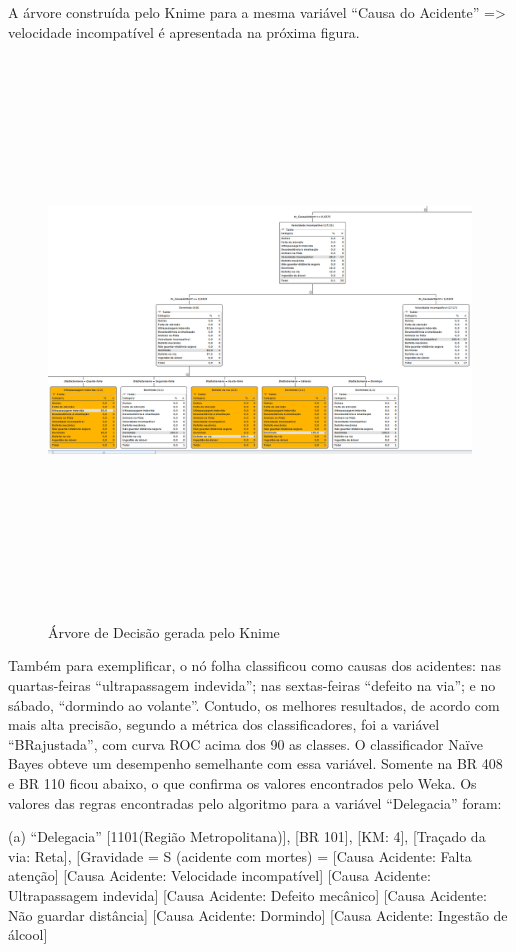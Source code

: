 A árvore construída pelo Knime para a mesma variável “Causa do Acidente” => velocidade incompatível é apresentada na
próxima figura.

\begin{figure}[!ht]
\centering
\caption{Árvore de Decisão gerada pelo Knime}
\includegraphics[width=150mm, height=145mm]{Figuras/Metodologia/arvoreKnime.png}
\label{fig:arvoreKnime}
\end{figure}

\pagebreak


Também para exemplificar, o nó folha classificou como causas dos acidentes: nas
quartas-feiras “ultrapassagem indevida”; nas sextas-feiras
“defeito na via”; e no sábado, “dormindo ao volante”.
Contudo, os melhores resultados, de acordo com mais alta
precisão, segundo a métrica dos classificadores, foi a variável
“BRajustada”, com curva ROC acima dos 90%
as classes. O classificador Naïve Bayes obteve um
desempenho semelhante com essa
variável. Somente na BR 408 e BR 110 ficou abaixo, o que
confirma os valores encontrados pelo Weka.
Os valores das regras encontradas pelo algoritmo para a
variável “Delegacia” foram:

(a) “Delegacia” [1101(Região Metropolitana)], [BR 101],
[KM: 4], [Traçado da via: Reta], [Gravidade = S (acidente com
mortes) = 
[Causa Acidente: Falta atenção]
[Causa Acidente: Velocidade incompatível]
[Causa Acidente: Ultrapassagem indevida]
[Causa Acidente: Defeito mecânico]
[Causa Acidente: Não guardar distância]
[Causa Acidente: Dormindo]
[Causa Acidente: Ingestão de álcool]

